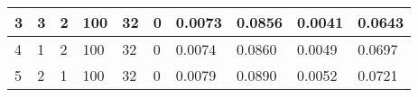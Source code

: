 \begin{table}
{\begin{tabular}{|llllllllll|}
3             & 3                                                               & 2                                                               & 100            & 32                                                             & 0                & 0.0073                                                                    & 0.0856                                                                   & 0.0041                                                               & 0.0643                                                              \\ \hline
4             & 1                                                               & 2                                                               & 100            & 32                                                             & 0                & 0.0074                                                                    & 0.0860                                                                   & 0.0049                                                               & 0.0697                                                              \\ \hline
5             & 2                                                               & 1                                                               & 100            & 32                                                             & 0                & 0.0079                                                                    & 0.0890                                                                   & 0.0052                                                               & 0.0721                                                              \\ \hline
\end{tabular}}
\clearpage
\end{table}